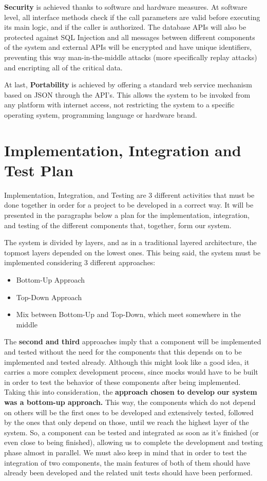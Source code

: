 \documentclass[12pt]{article}
\begin{document}
\textbf{Security} is achieved thanks to software and hardware measures. At software level, all interface methods check if the call parameters are valid before executing its main logic, and if the caller is authorized. The database APIs will also be protected against SQL Injection and all messages between different components of the system and external APIs will be encrypted and have unique identifiers, preventing this way man-in-the-middle attacks (more specifically replay attacks) and encripting all of the critical data.

At last, \textbf{Portability} is achieved by offering a standard web service mechanism based on JSON through the API's. This allows the system to be invoked from any platform with internet access, not restricting the system to a specific operating system, programming language or hardware brand.

\section{Implementation, Integration and Test Plan}
Implementation, Integration, and Testing are 3 different activities that must be done together in order for a project to be developed in a correct way. It will be presented in the paragraphs below a plan for the implementation, integration, and testing of the different components that, together, form our system.


The system is divided by layers, and as in a traditional layered architecture, the topmost layers depended on the lowest ones. This being said, the system must be implemented considering 3 different approaches:
\begin{itemize}
    \item Bottom-Up Approach
    \item Top-Down Approach
    \item Mix between Bottom-Up and Top-Down, which meet somewhere in the middle
\end{itemize}

The \textbf{second and third} approaches imply that a component will be implemented and tested without the need for the components that this depends on to be implemented and tested already. Although this might look like a good idea, it carries a more complex development process, since mocks would have to be built in order to test the behavior of these components after being implemented.
Taking this into consideration, the \textbf{approach chosen to develop our system was a bottom-up approach.} This way, the components which do not depend on others will be the first ones to be developed and extensively tested, followed by the ones that only depend on those, until we reach the highest layer of the system. So, a component can be tested and integrated as soon as it's finished (or even close to being finished), allowing us to complete the development and testing phase almost in parallel.
We must also keep in mind that in order to test the integration of two components, the main features of both of them should have already been developed and the related unit tests should have been performed. 
\end{document}
